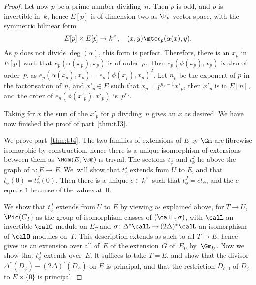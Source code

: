 \begin{proof}
Let now $p$ be a prime number dividing~$n$. Then $p$ is odd, and $p$
is invertible in~$k$, hence $E[p]$ is of dimension two as
$\F_p$-vector space, with the symmetric bilinear form\enlargethispage{-\baselineskip}
\[
E[p]\times E[p] \to k^\times,\quad (x,y)\mto e_p(\alpha(x),y).
\]
As $p$ does not divide $\deg(\alpha)$, this form is
perfect. Therefore, there is an $x_p$ in $E[p]$ such that
$e_p(\alpha(x_p),x_p)$ is of order~$p$. Then $e_p(\phi(x_p),x_p)$ is
also of order~$p$, as $e_p(\alpha(x_p),x_p)=e_p(\phi(x_p),x_p)^2$. Let
$n_p$ be the exponent of $p$ in the factorisation of~$n$, and
$x'_p\in E$ such that $x_p=p^{n_p-1}x'_p$, then $x'_p$ is in $E[n]$,
and the order of $e_n(\phi(x'_p),x'_p)$ is~$p^{n_p}$.

Taking for $x$ the sum of the $x'_p$ for $p$ dividing~$n$ gives an $x$
as desired. We have now finished the proof of part~\eqref{thm:tJ3}.

We prove part~\eqref{thm:tJ4}. The two families of extensions of $E$ by $\Gm$ are
fibrewise isomorphic by construction, hence there is a unique
isomorphism of extensions between them as $\Hom(E,\Gm)$ is
trivial. The sections $t_\phi$ and $t^J_\phi$ lie above the graph of
$\alpha\colon E\to E$. We~will show that $t^J_\phi$ extends from $U$
to $E$, and that $t_\phi(0)=t^J_\phi(0)$. Then there is a unique $c\in
k^\times$ such that $t^J_\phi=ct_\phi$, and the $c$ equals $1$ because
of the values at~$0$.

We show that $t^J_\phi$ extends from $U$ to $E$ by viewing as
explained above, for $T\to U$, $\Pic(C_T)$ as the group of isomorphism
classes of $(\calL,\sigma)$, with $\calL$ an invertible $\calO$\nobreakdash-module
on $E_T$ and $\sigma\colon \Delta^*\calL\to (2\Delta)^*\calL$ an
isomorphism of $\calO$-modules on~$T$. This description extends as
such to all $T\to E$, hence gives us an extension over all of~$E$ of
the extension~$G$ of~$E_U$ by~${\Gm}_U$. Now we show that
$t^J_\phi$ extends over~$E$. It suffices to take $T=E$, and show that
the divisor $\Delta^*(D_\phi)-(2\Delta)^*(D_\phi)$ on $E$ is principal,
and that the restriction $D_{\phi,0}$ of $D_\phi$ to $E\times\{0\}$ is
principal.


\end{proof}
